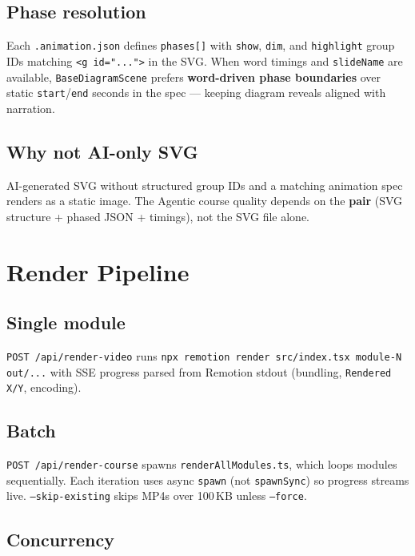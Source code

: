 \documentclass{scinexus}
\begin{document}
\subsection{Phase resolution}

Each \texttt{.animation.json} defines \texttt{phases[]} with \texttt{show}, \texttt{dim}, and \texttt{highlight} group IDs matching \texttt{<g id="...">} in the SVG. When word timings and \texttt{slideName} are available, \texttt{BaseDiagramScene} prefers \textbf{word-driven phase boundaries} over static \texttt{start}/\texttt{end} seconds in the spec --- keeping diagram reveals aligned with narration.

\subsection{Why not AI-only SVG}

AI-generated SVG without structured group IDs and a matching animation spec renders as a static image. The Agentic course quality depends on the \textbf{pair} (SVG structure + phased JSON + timings), not the SVG file alone.

\section{Render Pipeline}

\diagramRenderSequence

\subsection{Single module}

\texttt{POST /api/render-video} runs \texttt{npx remotion render src/index.tsx module-N out/...} with SSE progress parsed from Remotion stdout (bundling, \texttt{Rendered X/Y}, encoding).

\subsection{Batch}

\texttt{POST /api/render-course} spawns \texttt{renderAllModules.ts}, which loops modules sequentially. Each iteration uses async \texttt{spawn} (not \texttt{spawnSync}) so progress streams live. \texttt{--skip-existing} skips MP4s over 100\,KB unless \texttt{--force}.

\subsection{Concurrency}
\end{document}
